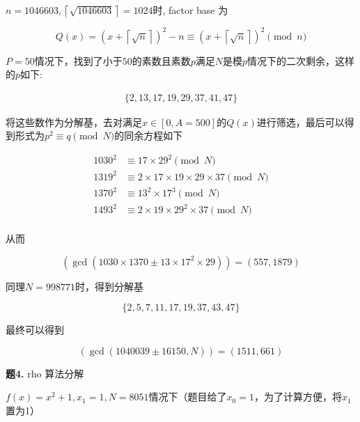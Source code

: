 \documentclass{article}
\begin{document}
$n = 1046603, \left\lceil\sqrt{1046603}\right\rceil=1024$时, factor base 为 

\begin{equation}
  Q(x) = (x + \left\lceil\sqrt{n}\right\rceil)^2-n\equiv (x + \left\lceil\sqrt{n}\right\rceil)^2\pmod{n}
\end{equation}

$P=50$情况下，找到了小于$50$的素数且素数$p$满足$N$是模$p$情况下的二次剩余，这样的$p$如下:

\begin{align*}
  \{2, 13, 17, 19, 29, 37, 41, 47\}
\end{align*}

将这些数作为分解基，去对满足$x\in[0,A=500]$的$Q(x)$进行筛选，最后可以得到形式为$p^2\equiv q\pmod{N}$的同余方程如下

\begin{equation}
  \begin{aligned}
    1030^2&\equiv 17\times 29^2\pmod{N}\\
    1319^2&\equiv 2\times 17\times 19\times 29\times 37\pmod{N}\\
    1370^2&\equiv 13^2\times 17^3\pmod{N}\\
    1493^2&\equiv 2\times 19\times 29^2\times 37\pmod{N} \\
  \end{aligned}
\end{equation}

从而

\begin{equation}
  \left(\gcd(1030\times1370\pm 13\times 17^2\times 29)\right) = (557,1879)
\end{equation}

同理$N=998771时$，得到分解基

\begin{equation}
  \{2, 5, 7, 11, 17, 19, 37, 43, 47\}
\end{equation}

最终可以得到

\begin{equation}
  \left(\gcd(1040039 \pm 16150, N)\right)=(1511, 661)
\end{equation}

\noindent \textbf{题4.} rho 算法分解

$f(x)=x^2+1,x_1=1,N=8051$情况下（题目给了$x_0=1$，为了计算方便，将$x_1$置为1）
\end{document}
